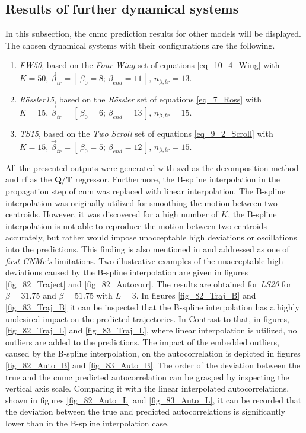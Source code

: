 \subsection{Results of further dynamical systems}
\label{subsec_3_5_2_Models}
In this subsection, the \gls{cnmc} prediction results for other models will be displayed. 
The chosen dynamical systems with their configurations are the following.
\begin{enumerate}
    \item  \emph{FW50}, based on the \emph{Four Wing} set of equations \eqref{eq_10_4_Wing} with $K=50, \, \vec{\beta }_{tr} = [\, \beta_0 = 8 ; \, \beta_{end} = 11 \,], \, n_{\beta, tr} = 13$.

    \item  \emph{Rössler15}, based on the \emph{Rössler} set of equations \eqref{eq_7_Ross} with $K=15, \, \vec{\beta }_{tr} = [\, \beta_0 = 6 ; \, \beta_{end} = 13 \,], \, n_{\beta, tr} = 15$.

    \item  \emph{TS15}, based on the \emph{Two Scroll} set of equations \eqref{eq_9_2_Scroll} with $K=15, \, \vec{\beta }_{tr} = [\, \beta_0 = 5 ; \, \beta_{end} = 12 \,], \, n_{\beta, tr} = 15$.    
\end{enumerate}
All the presented outputs were generated with \gls{svd} as the decomposition method and \gls{rf} as the $\bm Q / \bm T$ regressor.
Furthermore, the B-spline interpolation in the propagation step of \gls{cnm} was replaced with linear interpolation. 
The B-spline interpolation was originally utilized for smoothing the motion between two centroids. 
However, it was discovered for a high number of $K$, the B-spline interpolation is not able to reproduce the motion between two centroids accurately, but rather would impose unacceptable high deviations or oscillations into the predictions. 
This finding is also mentioned in \cite{Max2021} and addressed as one of \emph{ first CNMc's} limitations.  
Two illustrative examples of the unacceptable high deviations caused by the B-spline interpolation are given in figures \ref{fig_82_Traject} and \ref{fig_82_Autocorr}. 
The results are obtained for \emph{LS20} for $\beta = 31.75$ and $\beta = 51.75$ with $L=3$. 
In figures \ref{fig_82_Traj_B} and \ref{fig_83_Traj_B} it can be inspected that the B-spline interpolation has a highly undesired impact on the predicted trajectories.
In Contrast to that, in figures, \ref{fig_82_Traj_L} and \ref{fig_83_Traj_L}, where linear interpolation is utilized, no outliers are added to the predictions.
The impact of the embedded outliers, caused by the B-spline interpolation, on the autocorrelation is depicted in figures \ref{fig_82_Auto_B} and \ref{fig_83_Auto_B}.
The order of the deviation between the true and the \gls{cnmc} predicted autocorrelation can be grasped by inspecting the vertical axis scale.
Comparing it with the linear interpolated autocorrelations, shown in figures \ref{fig_82_Auto_L} and \ref{fig_83_Auto_L}, it can be recorded that the deviation between the true and predicted autocorrelations is significantly lower than in the B-spline interpolation case.
\newline 

